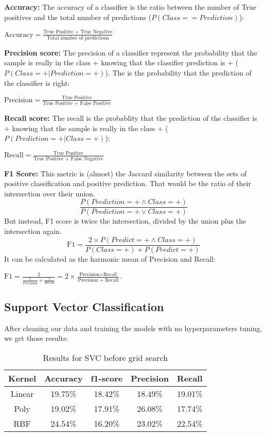 \documentclass[twocolumn]{article}
\begin{document}
\textbf{Accuracy:} The accuracy of a classifier is the ratio between the number of True positives and the total number of predictions ($P(Class == Prediction)$): 

\(\displaystyle \text{Accuracy} = \frac{\text{True Positive + True Negative}}{\text{Total number of predictions}} \)

\textbf{Precision score:} The precision of a classifier represent the probability that the sample is really in the class + knowing that the classifier prediction is + ($P(Class=+ | Prediction = +)$). The is the probability that the prediction of the classifier is right:

\(\displaystyle \text{Precision} = \frac{\text{True Positive}}{\text{True Positive + False Positive}}\)

\textbf{Recall score:} The recall is the probablity that the prediction of the classifier is + knowing that the sample is really in the class + ($P(Prediction=+ | Class = +)$):

\(\displaystyle \text{Recall} = \frac{\text{True Positive}}{\text{True Positive + False Negative}}\)


\textbf{F1 Score:} This metric is (almost) the Jaccard similarity between the sets of positive classification and positive prediction. That would be the ratio of their intersection over their union. 
$$\frac{P(Prediction=+ \land Class = +)}{P(Prediction=+ \lor Class = +)}$$
But instead, F1 score is twice the intersection, divided by the union plus the intersection again.
$$\text{F1} = \frac{2 \times P(Predict =+ \land Class = +)}{P(Class = +) +  P(Predict=+)}$$
It can be calculated as the harmonic mean of Precision and Recall:

\(\displaystyle \text{F1} = \frac{2}{\frac{1}{\text{Precision}} + \frac{1}{\text{Recall}}} \displaystyle = 2 \times \frac{\text{Precision}\times\text{Recall}}{\text{Precision + Recall}} \). 

\subsection{Support Vector Classification}
\label{5.3}
After cleaning our data and training the models with no hyperparameters tuning, we get those results:

\begin{table}[h]
    \centering
    \begin{tabular}{|c|c|c|c|c|}
    \hline
      Kernel & Accuracy & f1-score & Precision & Recall\\  
      \hline
      Linear & 19.75\% & 18.42\% & 18.49\% & 19.01\%\\
        \hline
      Poly & 19.02\% & 17.91\% & 26.08\% & 17.74\% \\
        \hline
      RBF & 24.54\% & 16.20\% & 23.02\% & 22.54\% \\
    \hline
    \end{tabular}
    \label{tab:my_label}
    \caption{Results for SVC before grid search}

\end{table}
\end{document}
